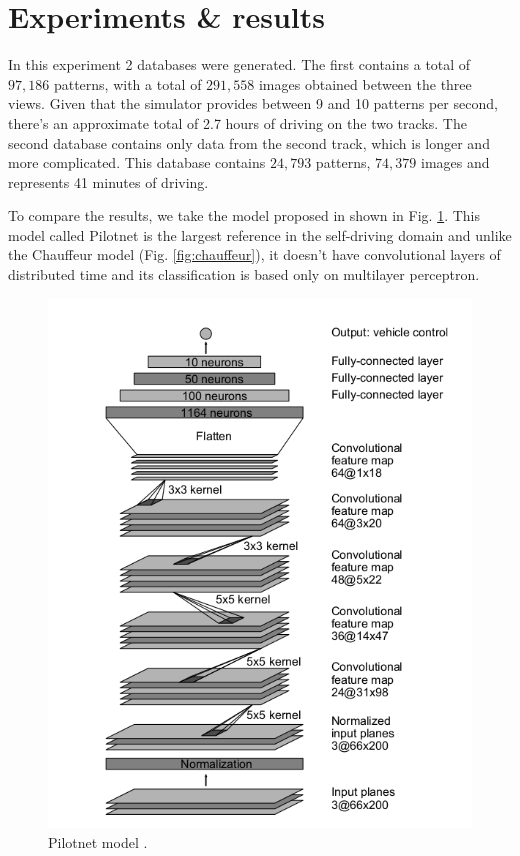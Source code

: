 \documentclass[conference]{IEEEtran}
\begin{document}
\section{Experiments \& results}
In this experiment 2 databases were generated. The first contains a total of $97, 186$ patterns, with a total of $291, 558$ images obtained between the three views. Given that the simulator provides between 9 and 10 patterns per second, there's an approximate total of 2.7 hours of driving on the two tracks. The second database contains only data from the second track, which is longer and more complicated. This database contains $24, 793$ patterns, $74, 379$ images and represents 41 minutes of driving.

To compare the results, we take the model proposed in \cite{bojarski2016end}\cite{bojarski2017explaining} shown in Fig. \ref{fig:pilotnet}. This model called Pilotnet is the largest reference in the self-driving domain and unlike the Chauffeur model (Fig. \ref{fig:chauffeur}), it doesn't have convolutional layers of distributed time and its classification is based only on multilayer perceptron.

\begin{figure}[h]
	\centerline{\includegraphics[scale=0.33]{img/pilotnet}}
	\caption{Pilotnet model \cite{bojarski2016end}.}
	\label{fig:pilotnet}
\end{figure}
\end{document}
